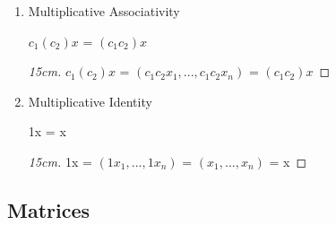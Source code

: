 \begin{enumerate}[label=(\alph*), leftmargin=2cm, itemsep=0.1cm]
\begin{proof}[15cm]
                \hspace{1.8cm}
                = $(c_1x_1 , ... , c_1x_n)$ + $(c_2x_1 , ... , c_2x_n)$
                = $c_1x + c_2x$
            \end{proof}

        \item {\color{lgreen} Multiplicative Associativity}
        
            \hspace{0.5cm}
            $c_1(c_2)x$ = $(c_1c_2)x$

            \begin{proof}[15cm]
                $c_1(c_2)x$
                = $(c_1c_2x_1,...,c_1c_2x_n)$
                = $(c_1c_2)x$
            \end{proof}

        \item {\color{lgreen} Multiplicative Identity}
        
            \hspace{0.5cm}
            1x = x

            \begin{proof}[15cm]
                1x
                = $(1x_1,...,1x_n)$
                = $(x_1,...,x_n)$
                = x
            \end{proof}
    \end{enumerate}

    



\subsection{ Matrices }

